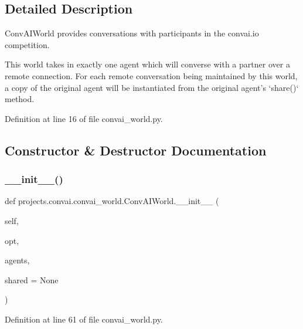 \subsection{Detailed Description}
\begin{DoxyVerb}ConvAIWorld provides conversations with participants in the convai.io competition.

This world takes in exactly one agent which will converse with a partner over a
remote connection. For each remote conversation being maintained by this world, a
copy of the original agent will be instantiated from the original agent's `share()`
method.
\end{DoxyVerb}
 

Definition at line 16 of file convai\+\_\+world.\+py.



\subsection{Constructor \& Destructor Documentation}
\mbox{\label{classprojects_1_1convai_1_1convai__world_1_1ConvAIWorld_abe0fa741d2ed06b8222ef930e1f7ab24}} 
\subsubsection{\texorpdfstring{\+\_\+\+\_\+init\+\_\+\+\_\+()}{\_\_init\_\_()}}
{\footnotesize\ttfamily def projects.\+convai.\+convai\+\_\+world.\+Conv\+A\+I\+World.\+\_\+\+\_\+init\+\_\+\+\_\+ (\begin{DoxyParamCaption}\item[{}]{self,  }\item[{}]{opt,  }\item[{}]{agents,  }\item[{}]{shared = {\ttfamily None} }\end{DoxyParamCaption})}



Definition at line 61 of file convai\+\_\+world.\+py.


